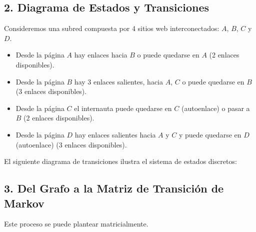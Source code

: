 \documentclass[11pt,a4paper]{article}
\theoremstyle{definition}
\begin{document}
\subsection*{2. Diagrama de Estados y Transiciones}
Consideremos una subred compuesta por 4 sitios web interconectados: $A$,
$B$, $C$ y $D$.
\begin{itemize}
    \item Desde la página $A$ hay enlaces hacia $B$ o puede quedarse en $A$ (2 enlaces disponibles).
    \item Desde la página $B$ hay 3 enlaces salientes, hacia $A$, $C$ o puede quedarse en $B$ (3 enlaces disponibles).
    \item Desde la página $C$ el internauta puede quedarse en $C$ (autoenlace) o pasar a $B$ (2 enlaces disponibles).
    \item Desde la página $D$ hay enlaces salientes hacia $A$ y $C$ y puede quedarse en $D$ (autoenlace) (3 enlaces disponibles).
\end{itemize}

El siguiente diagrama de transiciones ilustra el sistema de estados discretos:

\begin{center}
\end{center}

\subsection*{3. Del Grafo a la Matriz de Transición de Markov}
Este proceso se puede plantear matricialmente.
\end{document}
